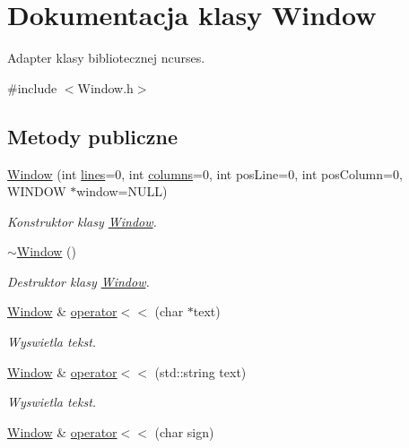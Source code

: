 \hypertarget{class_window}{}\section{Dokumentacja klasy Window}
\label{class_window}


Adapter klasy bibliotecznej ncurses.  




{\ttfamily \#include $<$Window.\+h$>$}

\subsection*{Metody publiczne}
\begin{DoxyCompactItemize}
\item 
\hyperlink{class_window_aec537c1c6aa1855eb41444fc67b6b362}{Window} (int \hyperlink{class_window_a2d89f391164858a8e53d301f247873dd}{lines}=0, int \hyperlink{class_window_a9df6358fb547f10baa070fc811995ba7}{columns}=0, int pos\+Line=0, int pos\+Column=0, W\+I\+N\+D\+O\+W $\ast$window=N\+U\+L\+L)
\begin{DoxyCompactList}\small\item\em Konstruktor klasy \hyperlink{class_window}{Window}. \end{DoxyCompactList}\item 
\hyperlink{class_window_a245d821e6016fa1f6970ccbbedd635f6}{$\sim$\+Window} ()
\begin{DoxyCompactList}\small\item\em Destruktor klasy \hyperlink{class_window}{Window}. \end{DoxyCompactList}\item 
\hyperlink{class_window}{Window} \& \hyperlink{class_window_a60f74654f00a5c9688295c8ec0d18126}{operator$<$$<$} (char $\ast$text)
\begin{DoxyCompactList}\small\item\em Wyswietla tekst. \end{DoxyCompactList}\item 
\hyperlink{class_window}{Window} \& \hyperlink{class_window_ac8de224c4fc4e781879b464f8606f804}{operator$<$$<$} (std\+::string text)
\begin{DoxyCompactList}\small\item\em Wyswietla tekst. \end{DoxyCompactList}\item 
\hyperlink{class_window}{Window} \& \hyperlink{class_window_a76fd2af7fc113d29f5488a7a629115d8}{operator$<$$<$} (char sign)

\end{DoxyCompactItemize}
